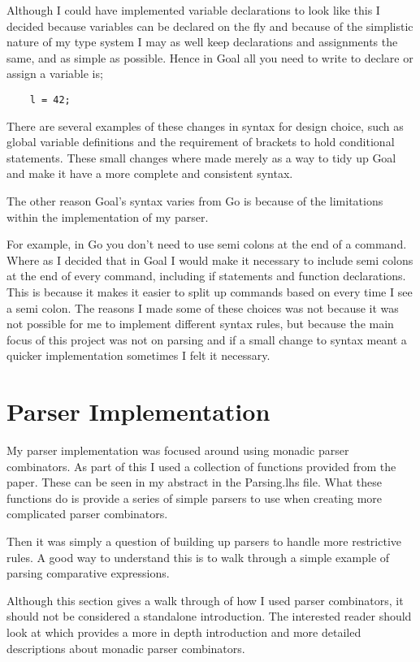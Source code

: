 Although I could have implemented variable declarations to look like this I decided because variables can be declared on the fly and because of the simplistic nature of my type system I may as well keep declarations and assignments the same, and as simple as possible. Hence in Goal all you need to write to declare or assign a variable is;

\begin{lstlisting}
	l = 42;
\end{lstlisting}
 
There are several examples of these changes in syntax for design choice, such as global variable definitions and the requirement of brackets to hold conditional statements. These small changes where made merely as a way to tidy up Goal and make it have a more complete and consistent syntax. 

The other reason Goal's syntax varies from Go is because of the limitations within the implementation of my parser. 

For example, in Go you don't need to use semi colons at the end of a command. Where as I decided that in Goal I would make it necessary to include semi colons at the end of every command, including if statements and function declarations. This is because it makes it easier to split up commands based on every time I see a semi colon. The reasons I made some of these choices was not because it was not possible for me to implement different syntax rules, but because the main focus of this project was not on parsing and if a small change to syntax meant a quicker implementation sometimes I felt it necessary. 


\section{Parser Implementation}

My parser implementation was focused around using monadic parser combinators. As part of this I used a collection of functions provided from the paper. %
These can be seen in my abstract in the Parsing.lhs file. What these functions do is provide a series of simple parsers to use when creating more complicated parser combinators. 

Then it was simply a question of building up parsers to handle more restrictive rules. A good way to understand this is to walk through a simple example of parsing comparative expressions. 

Although this section gives a walk through of how I used parser combinators, it should not be considered a standalone introduction. The interested reader should look at %
which provides a more in depth introduction and more detailed descriptions about monadic parser combinators.


